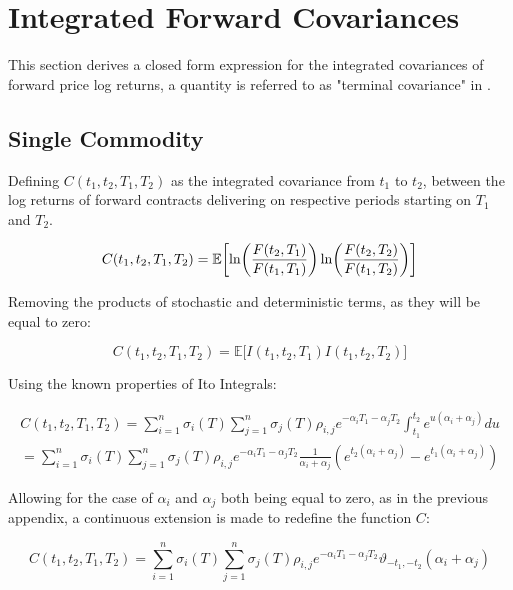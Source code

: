 \documentclass{article}
\begin{document}
\section{Integrated Forward Covariances}
\label{appendix:fwd_covar}
This section derives a closed form expression for the integrated covariances of
forward price log returns, a quantity is referred to as "terminal covariance" in
\cite{Rebonato}.

\subsection{Single Commodity}
Defining $C(t_1, t_2, T_1, T_2)$
as the integrated covariance from $t_1$ to $t_2$, between the log returns of forward 
contracts delivering on respective periods starting on $T_1$ and $T_2$.

\begin{equation}
    C(t_1, t_2, T_1, T_2) = \mathbb{E}\biggl[\ln\biggl(\frac{F(t_2, T_1)}{F(t_1, T_1)} \biggr) 
    \ln\biggl(\frac{F(t_2, T_2)}{F(t_1, T_2)} \biggr) \biggr] \\
\end{equation}

Removing the products of stochastic and deterministic terms, as they will be equal to zero:

\begin{equation}
    C(t_1, t_2, T_1, T_2) = \mathbb{E}\bigl[ I(t_1, t_2, T_1) I(t_1, t_2, T_2) \bigr] 
\end{equation}

Using the known properties of Ito Integrals:

\begin{eqnarray}
    \nonumber
    C(t_1, t_2, T_1, T_2) = \sum_{i=1}^n \sigma_i(T) \sum_{j=1}^n 
    \sigma_j(T) \rho_{i,j} e^{-\alpha_i T_1 -\alpha_j T_2} 
    \int_{t_1}^{t_2} e^{u(\alpha_i + \alpha_j)} du \\
    = \sum_{i=1}^n \sigma_i(T) \sum_{j=1}^n \sigma_j(T) \rho_{i,j} 
    e^{-\alpha_i T_1 -\alpha_j T_2} \frac{1}{\alpha_i + \alpha_j}
    (e^{t_2(\alpha_i + \alpha_j)} - e^{t_1(\alpha_i + \alpha_j)} )
\end{eqnarray}

Allowing for the case of $\alpha_i$ and $\alpha_j$ both being equal to zero, 
as in the previous appendix, a continuous extension is made to redefine the function
$C$:

\begin{equation}
    C(t_1, t_2, T_1, T_2) = \sum_{i=1}^n \sigma_i(T) \sum_{j=1}^n \sigma_j(T) \rho_{i,j} 
    e^{-\alpha_i T_1 -\alpha_j T_2} \vartheta_{-t_1, -t_2}(\alpha_i + \alpha_j)
\end{equation}
\end{document}
